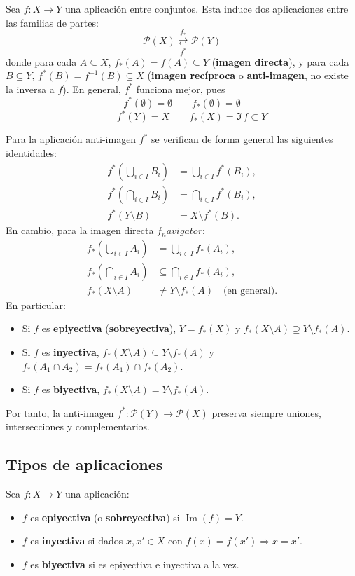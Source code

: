 Sea $f \colon X \to Y$ una aplicación entre conjuntos. Esta induce dos aplicaciones entre las familias de partes:
\[
    \mathcal{P}(X) \underset{f^*}{\overset{f_*}{\rightleftarrows}} \mathcal{P}(Y)
\]
donde para cada $A \subseteq X$, $f_*(A) = f(A) \subseteq Y$ (\textbf{imagen directa}), y para cada $B \subseteq Y$, $f^*(B) = f^{-1}(B) \subseteq X$ (\textbf{imagen recíproca} o \textbf{anti-imagen}, no existe la inversa a $f$). En general, $f^*$ funciona mejor, pues
$$f^*(\emptyset) = \emptyset \qquad f_*(\emptyset) = \emptyset$$
$$\qquad f^*(Y) = X \qquad f_*(X) = \Im\, f \subset Y$$
\begin{propi}
Para la aplicación anti-imagen $f^*$ se verifican de forma general las siguientes identidades:
\begin{align*}
    f^*\left(\bigcup_{i \in I} B_i\right) &= \bigcup_{i \in I} f^*(B_i), \\
    f^*\left(\bigcap_{i \in I} B_i\right) &= \bigcap_{i \in I} f^*(B_i), \\
    f^*(Y \setminus B) &= X \setminus f^*(B).
\end{align*}
En cambio, para la imagen directa $f_navigator$:
\begin{align*}
    f_*\left(\bigcup_{i \in I} A_i\right) &= \bigcup_{i \in I} f_*(A_i), \\
    f_*\left(\bigcap_{i \in I} A_i\right) &\subseteq \bigcap_{i \in I} f_*(A_i), \\
    f_*(X \setminus A) &\ne Y \setminus f_*(A) \quad \text{(en general)}.
\end{align*}
En particular:
\begin{itemize}
    \item Si $f$ es \textbf{epiyectiva} (\textbf{sobreyectiva}), $Y = f_*(X)$ y $f_*(X \setminus A) \supseteq Y \setminus f_*(A)$.
    \item Si $f$ es \textbf{inyectiva}, $f_*(X \setminus A) \subseteq Y \setminus f_*(A)$ y $f_*(A_1 \cap A_2) = f_*(A_1) \cap f_*(A_2)$.
    \item Si $f$ es \textbf{biyectiva}, $f_*(X \setminus A) = Y \setminus f_*(A)$.
\end{itemize}
Por tanto, la anti-imagen $f^* \colon \mathcal{P}(Y) \to \mathcal{P}(X)$ preserva siempre uniones, intersecciones y complementarios.
\end{propi}


\subsection*{Tipos de aplicaciones}
Sea $f \colon X \to Y$ una aplicación:
\begin{itemize}
    \item $f$ es \textbf{epiyectiva} (o \textbf{sobreyectiva}) si $\operatorname{Im}(f) = Y$.
    \item $f$ es \textbf{inyectiva} si dados $x, x' \in X$ con $f(x) = f(x') \Rightarrow x = x'$.
    \item $f$ es \textbf{biyectiva} si es epiyectiva e inyectiva a la vez.
\end{itemize}

